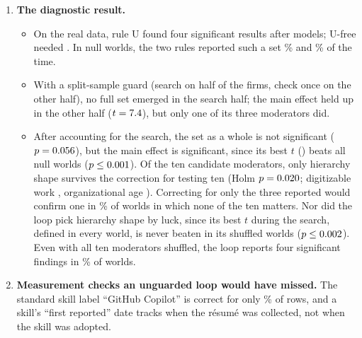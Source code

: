\documentclass[11pt]{article}
\begin{document}
\begin{enumerate}
\item \textbf{The diagnostic result.}
\begin{itemize}
\item On the real data, rule U found four significant results after
\ModelsToFirstU models; U-free needed \ModelsToFirstFree. In null worlds, the two rules reported such a set \PotemU\% and
\PotemFree\% of the time.
\item With a split-sample guard (search on half of the firms, check once on the other half), no full set emerged in the search half; the main effect held up in the other half
($t=7.4$), but only one of its three moderators did.
\item After accounting for the search, the set as a whole is not significant ($p=0.056$), but the main effect is
significant, since its best $t$ (\HoneMaxT) beats all \Bnull null worlds ($p\le0.001$). Of the ten candidate moderators, only hierarchy shape survives the correction for testing ten (Holm
$p=0.020$; digitizable work \VHolmTenRem, organizational age \VHolmTenAge). Correcting for only the three reported
would confirm one in \VFwerHolmThree\% of worlds in which none of the ten matters. Nor did the loop pick hierarchy
shape by luck, since its best $t$ during the search, defined in every world, is never
beaten in its shuffled worlds ($p\le0.002$). Even with all ten moderators shuffled, the loop reports four significant
findings in \VJointSuccess\% of worlds.
\end{itemize}

\item \textbf{Measurement checks an unguarded loop would have missed.} The standard skill label ``GitHub Copilot'' is
correct for only \GitHubValid\% of rows, and a skill's ``first reported'' date tracks when the r\'esum\'e was collected, not
when the skill was adopted.
\end{enumerate}
\end{document}
